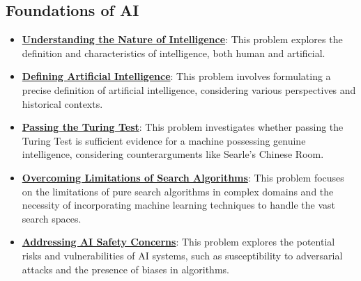 \documentclass{article}%
\begin{document}
\subsection{Foundations of AI}%
\label{subsec:FoundationsofAI}%
\begin{itemize}[leftmargin=*]%
\item \href{https://purdue.brightspace.com/d2l/common/assets/pdfjs-d2l-dist/1.0.14-legacy/web/viewer.html?file=\%2Fcontent\%2Fenforced\%2F1095467-wl.202510.CS.24300.001\%2F02L2-Intro.pdf\%3Fou\%3D1095467\&lang=en-us\&container=d2l-fileviewer-rendered-pdf\&fullscreen=d2l-fileviewer-rendered-pdf-dialog\&height=667#page=3}{\textbf{Understanding the Nature of Intelligence}}: This problem explores the definition and characteristics of intelligence, both human and artificial.%
\item \href{https://purdue.brightspace.com/d2l/common/assets/pdfjs-d2l-dist/1.0.14-legacy/web/viewer.html?file=\%2Fcontent\%2Fenforced\%2F1095467-wl.202510.CS.24300.001\%2F02L2-Intro.pdf\%3Fou\%3D1095467\&lang=en-us\&container=d2l-fileviewer-rendered-pdf\&fullscreen=d2l-fileviewer-rendered-pdf-dialog\&height=667#page=5}{\textbf{Defining Artificial Intelligence}}: This problem involves formulating a precise definition of artificial intelligence, considering various perspectives and historical contexts.%
\item \href{https://purdue.brightspace.com/d2l/common/assets/pdfjs-d2l-dist/1.0.14-legacy/web/viewer.html?file=\%2Fcontent\%2Fenforced\%2F1095467-wl.202510.CS.24300.001\%2F02L2-Intro.pdf\%3Fou\%3D1095467\&lang=en-us\&container=d2l-fileviewer-rendered-pdf\&fullscreen=d2l-fileviewer-rendered-pdf-dialog\&height=667#page=6}{\textbf{Passing the Turing Test}}: This problem investigates whether passing the Turing Test is sufficient evidence for a machine possessing genuine intelligence, considering counterarguments like Searle's Chinese Room.%
\item \href{https://purdue.brightspace.com/d2l/common/assets/pdfjs-d2l-dist/1.0.14-legacy/web/viewer.html?file=\%2Fcontent\%2Fenforced\%2F1095467-wl.202510.CS.24300.001\%2F02L2-Intro.pdf\%3Fou\%3D1095467\&lang=en-us\&container=d2l-fileviewer-rendered-pdf\&fullscreen=d2l-fileviewer-rendered-pdf-dialog\&height=667#page=12}{\textbf{Overcoming Limitations of Search Algorithms}}: This problem focuses on the limitations of pure search algorithms in complex domains and the necessity of incorporating machine learning techniques to handle the vast search spaces.%
\item \href{https://purdue.brightspace.com/d2l/common/assets/pdfjs-d2l-dist/1.0.14-legacy/web/viewer.html?file=\%2Fcontent\%2Fenforced\%2F1095467-wl.202510.CS.24300.001\%2F02L2-Intro.pdf\%3Fou\%3D1095467\&lang=en-us\&container=d2l-fileviewer-rendered-pdf\&fullscreen=d2l-fileviewer-rendered-pdf-dialog\&height=667#page=19}{\textbf{Addressing AI Safety Concerns}}: This problem explores the potential risks and vulnerabilities of AI systems, such as susceptibility to adversarial attacks and the presence of biases in algorithms.%

\end{itemize}
\end{document}
